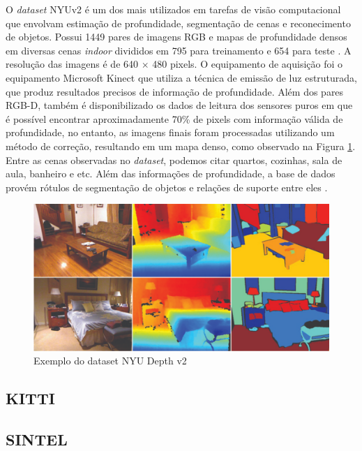 
O \textit{dataset} NYUv2 é um dos mais utilizados em tarefas de visão computacional que envolvam estimação de profundidade, segmentação de cenas e reconecimento de objetos. Possui 1449 pares de imagens RGB e mapas de profundidade densos em diversas cenas \textit{indoor} divididos em 795 para treinamento e 654 para teste \cite{silberman2012indoor}. A resolução das imagens é de 640 $\times$ 480 pixels. O equipamento de aquisição foi o equipamento Microsoft Kinect que utiliza a técnica de emissão de luz estruturada, que produz resultados precisos de informação de profundidade. Além dos pares RGB-D, também é disponibilizado os dados de leitura dos sensores puros em que é possível encontrar aproximadamente 70\% de pixels com informação válida de profundidade, no entanto, as imagens finais foram processadas utilizando um método de correção, resultando em um mapa denso, como observado na Figura \ref{exnyuv2}. Entre as cenas observadas no \textit{dataset}, podemos citar quartos, cozinhas, sala de aula, banheiro e etc. Além das informações de profundidade, a base de dados provém rótulos de segmentação de objetos e relações de suporte entre eles \cite{lahiri2024deep}.

\begin{figure}[h]
    \centering
    \includegraphics[width=\textwidth]{fig/example_nyu.png}
    \caption{Exemplo do dataset NYU Depth v2}
    \label{exnyuv2}
\end{figure}

\subsection{KITTI}



\subsection{SINTEL}


